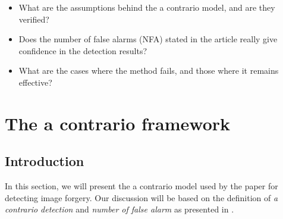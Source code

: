 \documentclass[sigconf, nonacm]{acmart}
\begin{document}
\begin{itemize}
    \item What are the assumptions behind the a contrario model, and are they verified?
    \item Does the number of false alarms (NFA) stated in the article really give confidence in the detection results?
    \item What are the cases where the method fails, and those where it remains effective?
\end{itemize}

\section{The a contrario framework} \label{sec:a_contrario}

\subsection{Introduction}

In this section, we will present the a contrario model used by the paper for detecting image forgery. Our discussion will be based on the definition of \textit{a contrario detection} and \textit{number of false alarm} as presented in \cite{morel_detection_2021}.
\end{document}
